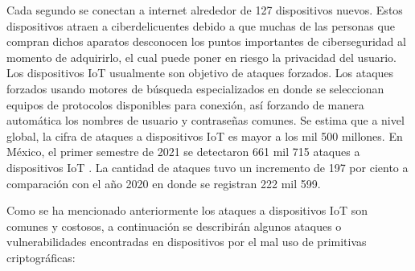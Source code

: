 \documentclass{article}
\begin{document}
            Cada segundo se conectan a internet alrededor de 127 dispositivos nuevos. Estos dispositivos atraen a ciberdelicuentes debido a que muchas de las personas que compran dichos aparatos desconocen los puntos importantes de ciberseguridad al momento de adquirirlo, el cual puede poner en riesgo la privacidad del usuario. Los dispositivos IoT usualmente son objetivo de ataques forzados. Los ataques forzados usando motores de búsqueda especializados en donde se seleccionan equipos de protocolos disponibles para conexión, así forzando de manera automática los nombres de usuario y contraseñas comunes. Se estima que a nivel global, la cifra de ataques a dispositivos IoT es mayor a los mil 500 millones. En México, el primer semestre de 2021 se detectaron 661 mil 715 ataques a dispositivos IoT \cite{rios_2022}. La cantidad de ataques tuvo un incremento de 197 por ciento a comparación con el año 2020 en donde se registran 222 mil 599.

            Como se ha mencionado anteriormente los ataques a dispositivos IoT son comunes y costosos, a continuación se describirán algunos ataques o vulnerabilidades encontradas en dispositivos por el mal uso de primitivas criptográficas:
\end{document}
